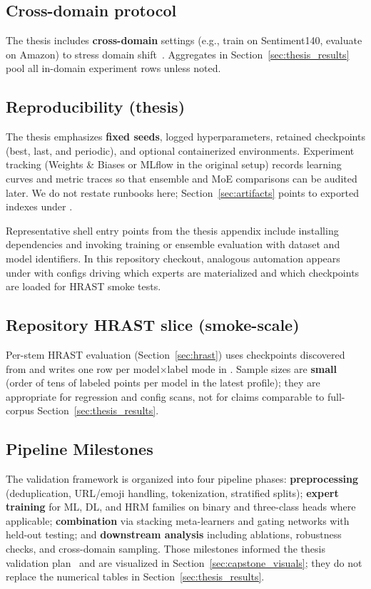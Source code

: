 \subsection{Cross-domain protocol}
The thesis includes \textbf{cross-domain} settings (e.g., train on Sentiment140, evaluate on Amazon) to stress domain shift~\cite{ref05,ref06,ref30}. Aggregates in Section~\ref{sec:thesis_results} pool all in-domain experiment rows unless noted.

\subsection{Reproducibility (thesis)}
The thesis emphasizes \textbf{fixed seeds}, logged hyperparameters, retained checkpoints (best, last, and periodic), and optional containerized environments. Experiment tracking (Weights \& Biases or MLflow in the original setup) records learning curves and metric traces so that ensemble and MoE comparisons can be audited later. We do not restate runbooks here; Section~\ref{sec:artifacts} points to exported indexes under .

Representative shell entry points from the thesis appendix include installing dependencies and invoking training or ensemble evaluation with dataset and model identifiers. In this repository checkout, analogous automation appears under  with configs driving which experts are materialized and which checkpoints are loaded for HRAST smoke tests.

\subsection{Repository HRAST slice (smoke-scale)}
Per-stem HRAST evaluation (Section~\ref{sec:hrast}) uses checkpoints discovered from  and writes one row per model$\times$label mode in . Sample sizes are \textbf{small} (order of tens of labeled points per model in the latest profile); they are appropriate for regression and config scans, not for claims comparable to full-corpus Section~\ref{sec:thesis_results}.

\subsection{Pipeline Milestones}
The validation framework is organized into four pipeline phases: \textbf{preprocessing} (deduplication, URL/emoji handling, tokenization, stratified splits); \textbf{expert training} for ML, DL, and HRM families on binary and three-class heads where applicable; \textbf{combination} via stacking meta-learners and gating networks with held-out testing; and \textbf{downstream analysis} including ablations, robustness checks, and cross-domain sampling. Those milestones informed the thesis validation plan~\cite{ref16,ref17,ref22} and are visualized in Section~\ref{sec:capstone_visuals}; they do not replace the numerical tables in Section~\ref{sec:thesis_results}.
